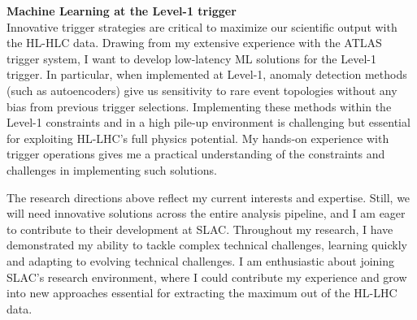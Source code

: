 \documentclass[11pt, a4paper]{awesome-cv}
\begin{document}
\begin{cvletter}
  \textbf{Machine Learning at the Level-1 trigger}\\
  Innovative trigger strategies are critical to maximize our scientific output with the HL-HLC data. Drawing from my extensive experience with the ATLAS trigger system, I want to develop low-latency ML solutions for the Level-1 trigger. In particular, when implemented at Level-1, anomaly detection methods (such as autoencoders) give us sensitivity to rare event topologies without any bias from previous trigger selections. Implementing these methods within the Level-1 constraints and in a high pile-up environment is challenging but essential for exploiting HL-LHC's full physics potential. My hands-on experience with trigger operations gives me a practical understanding of the constraints and challenges in implementing such solutions.
  
  The research directions above reflect my current interests and expertise. Still, we will need innovative solutions across the entire analysis pipeline, and I am eager to contribute to their development at SLAC. Throughout my research, I have demonstrated my ability to tackle complex technical challenges, learning quickly and adapting to evolving technical challenges. I am enthusiastic about joining SLAC's research environment, where I could contribute my experience and grow into new approaches essential for extracting the maximum out of the HL-LHC data.

\end{cvletter}

\makeletterclosing
\end{document}
